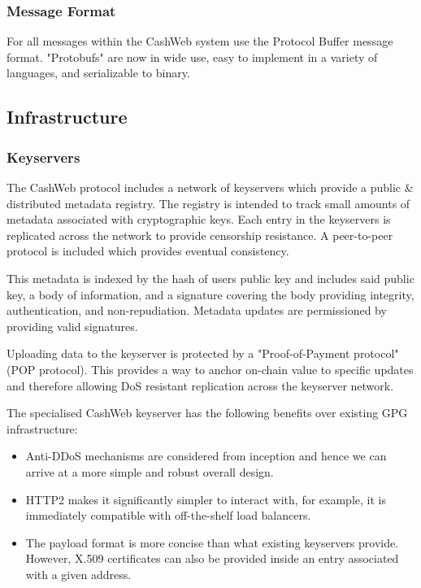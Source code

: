 \documentclass{article}
\begin{document}
\subsubsection{Message Format}

For all messages within the CashWeb system use the Protocol Buffer message format. "Protobufs" are now in wide use, easy to implement in a variety of languages, and serializable to binary.

\subsection{Infrastructure}

\subsubsection{Keyservers}

The CashWeb protocol includes a network of keyservers which provide a public \& distributed metadata registry. The registry is intended to track small amounts of metadata associated with cryptographic keys. Each entry in the keyservers is replicated across the network to provide censorship resistance. A peer-to-peer protocol is included which provides eventual consistency.

This metadata is indexed by the hash of users public key and includes said public key, a body of information, and a signature covering the body providing integrity, authentication, and non-repudiation. Metadata updates are permissioned by providing valid signatures.

Uploading data to the keyserver is protected by a "Proof-of-Payment protocol" (POP protocol). This provides a way to anchor on-chain value to specific updates and therefore allowing DoS resistant replication across the keyserver network.

The specialised CashWeb keyserver has the following benefits over existing GPG infrastructure:
\begin{itemize}
  \item Anti-DDoS mechanisms are considered from inception and hence we can arrive at a more simple and robust overall design.
  \item HTTP2 makes it significantly simpler to interact with, for example, it is immediately compatible with off-the-shelf load balancers.
  \item The payload format is more concise than what existing keyservers provide. However, X.509 certificates can also be provided inside an entry associated with a given address.
\end{itemize}
\end{document}

